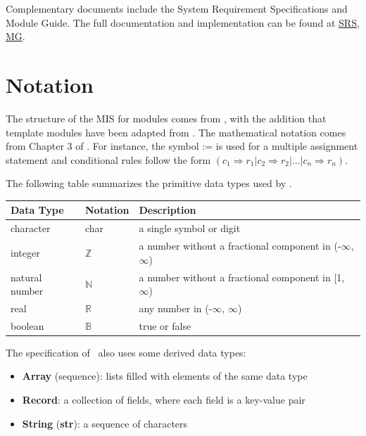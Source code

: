 \documentclass[12pt, titlepage]{article}
\begin{document}
Complementary documents include the System Requirement Specifications
and Module Guide.  The full documentation and implementation can be
found at \href{https://github.com/omltcat/turbulent-flow/blob/main/docs/SRS/SRS.pdf}{SRS}, \href{https://github.com/omltcat/turbulent-flow/blob/main/docs/Design/SoftArchitecture/MG.pdf}{MG}.  

\section{Notation}


The structure of the MIS for modules comes from \citet{HoffmanAndStrooper1995},
with the addition that template modules have been adapted from
\cite{GhezziEtAl2003}.  The mathematical notation comes from Chapter 3 of
\citet{HoffmanAndStrooper1995}.  For instance, the symbol := is used for a
multiple assignment statement and conditional rules follow the form $(c_1
\Rightarrow r_1 | c_2 \Rightarrow r_2 | ... | c_n \Rightarrow r_n )$.

The following table summarizes the primitive data types used by \progname. 

\begin{center}
\renewcommand{\arraystretch}{1.2}
\noindent 
\begin{tabular}{l l p{7.5cm}} 
\toprule 
\textbf{Data Type} & \textbf{Notation} & \textbf{Description}\\ 
\midrule
character & char & a single symbol or digit\\
integer & $\mathbb{Z}$ & a number without a fractional component in (-$\infty$, $\infty$) \\
natural number & $\mathbb{N}$ & a number without a fractional component in [1, $\infty$) \\
real & $\mathbb{R}$ & any number in (-$\infty$, $\infty$)\\
boolean & $\mathbb{B}$ & true or false \\
\bottomrule
\end{tabular} 
\end{center}

\noindent
The specification of \progname \ also uses some derived data types: 
\begin{itemize}
  \item \textbf{Array} (sequence): lists filled with elements of the same data type
  \item \textbf{Record}: a collection of fields, where each field is a key-value pair
  \item \textbf{String} (\textbf{str}): a sequence of characters 
\end{itemize}
\end{document}
